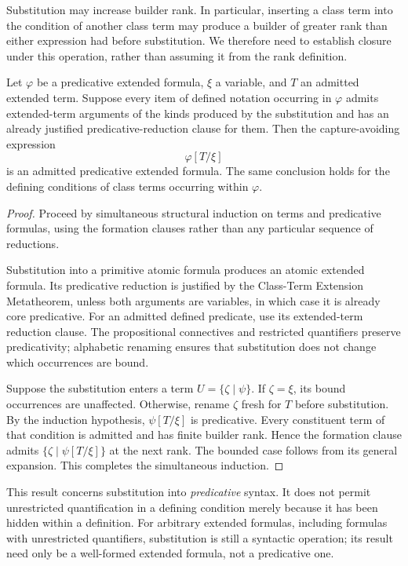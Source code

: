 Substitution may increase builder rank. In particular, inserting a
class term into the condition of another class term may produce a
builder of greater rank than either expression had before
substitution. We therefore need to establish closure under this
operation, rather than assuming it from the rank definition.

\begin{metatheorem}
\label{meta:predicativity-under-term-substitution}
Let \(\varphi\) be a predicative extended formula, \(\xi\) a
variable, and \(T\) an admitted extended term. Suppose every item
of defined notation occurring in \(\varphi\) admits extended-term
arguments of the kinds produced by the substitution and has an
already justified predicative-reduction clause for them. Then the
capture-avoiding expression
\[
\varphi[T/\xi]
\]
is an admitted predicative extended formula. The same conclusion
holds for the defining conditions of class terms occurring within
\(\varphi\).
\end{metatheorem}

\begin{proof}
Proceed by simultaneous structural induction on terms and
predicative formulas, using the formation clauses rather than any
particular sequence of reductions.

Substitution into a primitive atomic formula produces an atomic
extended formula. Its predicative reduction is justified by the
Class-Term Extension Metatheorem, unless both arguments are
variables, in which case it is already core predicative. For an
admitted defined predicate, use its extended-term reduction clause.
The propositional connectives and restricted quantifiers preserve
predicativity; alphabetic renaming ensures that substitution does
not change which occurrences are bound.

Suppose the substitution enters a term
\(U=\{\zeta\mid\psi\}\). If \(\zeta=\xi\), its bound
occurrences are unaffected. Otherwise, rename \(\zeta\) fresh for
\(T\) before substitution. By the induction hypothesis,
\(\psi[T/\xi]\) is predicative. Every constituent term of that
condition is admitted and has finite builder rank. Hence the
formation clause admits
\(\{\zeta\mid\psi[T/\xi]\}\) at the next rank. The bounded
case follows from its general expansion. This completes the
simultaneous induction.
\end{proof}

This result concerns substitution into \emph{predicative} syntax.
It does not permit unrestricted quantification in a defining
condition merely because it has been hidden within a definition.
For arbitrary extended formulas, including formulas with unrestricted
quantifiers, substitution is still a syntactic operation; its
result need only be a well-formed extended formula, not a
predicative one.

